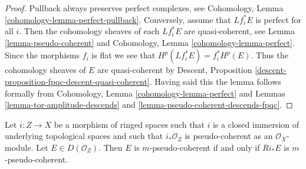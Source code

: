 \begin{proof}
Pullback always preserves perfect complexes, see
Cohomology, Lemma \ref{cohomology-lemma-perfect-pullback}.
Conversely, assume that $Lf_i^*E$ is perfect for all $i$.
Then the cohomology sheaves of each $Lf_i^*E$ are quasi-coherent, see
Lemma \ref{lemma-pseudo-coherent}
and
Cohomology, Lemma \ref{cohomology-lemma-perfect}.
Since the morphisms $f_i$ is flat we see that $H^p(Lf_i^*E) = f_i^*H^p(E)$.
Thus the cohomology sheaves of $E$ are quasi-coherent by
Descent, Proposition \ref{descent-proposition-fpqc-descent-quasi-coherent}.
Having said this the lemma follows formally from
Cohomology, Lemma \ref{cohomology-lemma-perfect}
and
Lemmas \ref{lemma-tor-amplitude-descends} and
\ref{lemma-pseudo-coherent-descends-fpqc}.
\end{proof}

\begin{lemma}
\label{lemma-closed-push-pseudo-coherent}
Let $i : Z \to X$ be a morphism of ringed spaces such that
$i$ is a closed immersion of underlying topological spaces and such that
$i_*\mathcal{O}_Z$ is pseudo-coherent as an $\mathcal{O}_X$-module.
Let $E \in D(\mathcal{O}_Z)$. Then $E$ is $m$-pseudo-coherent
if and only if $Ri_*E$ is $m$-pseudo-coherent.
\end{lemma}

